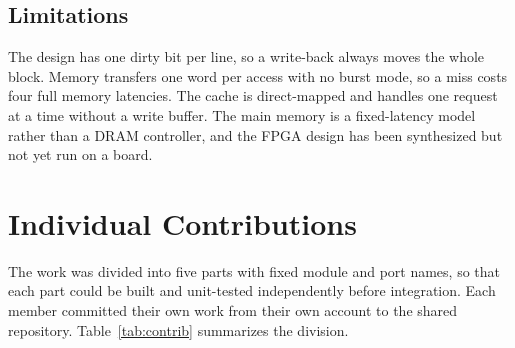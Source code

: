 \documentclass[conference]{IEEEtran}
\begin{document}
\subsection{Limitations}
The design has one dirty bit per line, so a write-back always moves the whole block. Memory transfers one word per access with no burst mode, so a miss costs four full memory latencies. The cache is direct-mapped and handles one request at a time without a write buffer. The main memory is a fixed-latency model rather than a DRAM controller, and the FPGA design has been synthesized but not yet run on a board.

\section{Individual Contributions}
\label{sec:contrib}

The work was divided into five parts with fixed module and port names, so that each part could be built and unit-tested independently before integration. Each member committed their own work from their own account to the shared repository. Table~\ref{tab:contrib} summarizes the division.
\end{document}
